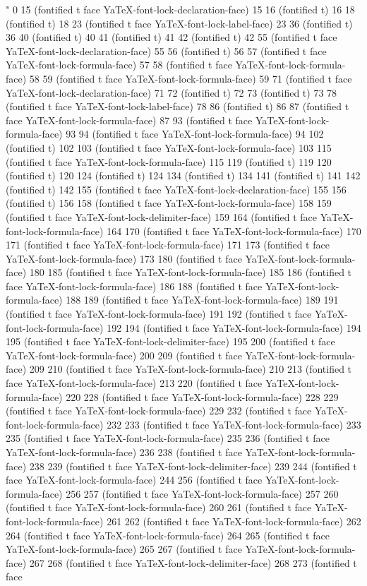 " 0 15 (fontified t face YaTeX-font-lock-declaration-face) 15 16 (fontified t) 16 18 (fontified t) 18 23 (fontified t face YaTeX-font-lock-label-face) 23 36 (fontified t) 36 40 (fontified t) 40 41 (fontified t) 41 42 (fontified t) 42 55 (fontified t face YaTeX-font-lock-declaration-face) 55 56 (fontified t) 56 57 (fontified t face YaTeX-font-lock-formula-face) 57 58 (fontified t face YaTeX-font-lock-formula-face) 58 59 (fontified t face YaTeX-font-lock-formula-face) 59 71 (fontified t face YaTeX-font-lock-declaration-face) 71 72 (fontified t) 72 73 (fontified t) 73 78 (fontified t face YaTeX-font-lock-label-face) 78 86 (fontified t) 86 87 (fontified t face YaTeX-font-lock-formula-face) 87 93 (fontified t face YaTeX-font-lock-formula-face) 93 94 (fontified t face YaTeX-font-lock-formula-face) 94 102 (fontified t) 102 103 (fontified t face YaTeX-font-lock-formula-face) 103 115 (fontified t face YaTeX-font-lock-formula-face) 115 119 (fontified t) 119 120 (fontified t) 120 124 (fontified t) 124 134 (fontified t) 134 141 (fontified t) 141 142 (fontified t) 142 155 (fontified t face YaTeX-font-lock-declaration-face) 155 156 (fontified t) 156 158 (fontified t face YaTeX-font-lock-formula-face) 158 159 (fontified t face YaTeX-font-lock-delimiter-face) 159 164 (fontified t face YaTeX-font-lock-formula-face) 164 170 (fontified t face YaTeX-font-lock-formula-face) 170 171 (fontified t face YaTeX-font-lock-formula-face) 171 173 (fontified t face YaTeX-font-lock-formula-face) 173 180 (fontified t face YaTeX-font-lock-formula-face) 180 185 (fontified t face YaTeX-font-lock-formula-face) 185 186 (fontified t face YaTeX-font-lock-formula-face) 186 188 (fontified t face YaTeX-font-lock-formula-face) 188 189 (fontified t face YaTeX-font-lock-formula-face) 189 191 (fontified t face YaTeX-font-lock-formula-face) 191 192 (fontified t face YaTeX-font-lock-formula-face) 192 194 (fontified t face YaTeX-font-lock-formula-face) 194 195 (fontified t face YaTeX-font-lock-delimiter-face) 195 200 (fontified t face YaTeX-font-lock-formula-face) 200 209 (fontified t face YaTeX-font-lock-formula-face) 209 210 (fontified t face YaTeX-font-lock-formula-face) 210 213 (fontified t face YaTeX-font-lock-formula-face) 213 220 (fontified t face YaTeX-font-lock-formula-face) 220 228 (fontified t face YaTeX-font-lock-formula-face) 228 229 (fontified t face YaTeX-font-lock-formula-face) 229 232 (fontified t face YaTeX-font-lock-formula-face) 232 233 (fontified t face YaTeX-font-lock-formula-face) 233 235 (fontified t face YaTeX-font-lock-formula-face) 235 236 (fontified t face YaTeX-font-lock-formula-face) 236 238 (fontified t face YaTeX-font-lock-formula-face) 238 239 (fontified t face YaTeX-font-lock-delimiter-face) 239 244 (fontified t face YaTeX-font-lock-formula-face) 244 256 (fontified t face YaTeX-font-lock-formula-face) 256 257 (fontified t face YaTeX-font-lock-formula-face) 257 260 (fontified t face YaTeX-font-lock-formula-face) 260 261 (fontified t face YaTeX-font-lock-formula-face) 261 262 (fontified t face YaTeX-font-lock-formula-face) 262 264 (fontified t face YaTeX-font-lock-formula-face) 264 265 (fontified t face YaTeX-font-lock-formula-face) 265 267 (fontified t face YaTeX-font-lock-formula-face) 267 268 (fontified t face YaTeX-font-lock-delimiter-face) 268 273 (fontified t face 